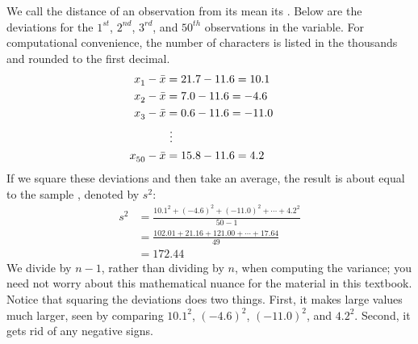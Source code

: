 We call the distance of an observation from its mean its . Below are the deviations for the $1^{st}_{}$, $2^{nd}_{}$, $3^{rd}$, and $50^{th}_{}$ observations in the  variable. For computational convenience, the number of characters is listed in the thousands and rounded to the first decimal.
\begin{align*}
x_1^{}-\bar{x} &= 21.7 - 11.6 = 10.1 \hspace{5mm}\text{ } \\
x_2^{}-\bar{x} &= 7.0 - 11.6 = -4.6 \\
x_3^{}-\bar{x} &= 0.6 - 11.6 = -11.0 \\
			&\ \vdots \\
x_{50}^{}-\bar{x} &= 15.8 - 11.6 = 4.2
\end{align*}
If we square these deviations and then take an average, the result is about equal to the sample \label{varianceIsDefined}, denoted by $s_{}^2$:
\begin{align*}
s_{}^2 &= \frac{10.1_{}^2 + (-4.6)_{}^2 + (-11.0)_{}^2 + \cdots + 4.2_{}^2}{50-1} \\
	&= \frac{102.01 + 21.16 + 121.00 + \cdots + 17.64}{49} \\
	&= 172.44
\end{align*}
We divide by $n-1$, rather than dividing by $n$, when computing the variance; you need not worry about this mathematical nuance for the material in this textbook. Notice that squaring the deviations does two things. First, it makes large values much larger, seen by comparing $10.1^2$, $(-4.6)^2$, $(-11.0)^2$, and $4.2^2$. Second, it gets rid of any negative signs.


